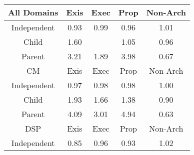 \begin{tabular}{|c||c|c|c|c|}
\hline
All Domains & Exis & Exec & Prop & Non-Arch \\ 
\hline
Independent & \cellcolor[rgb]{0.8931142058397374,0.7600739076414238,0.4042399254504216} 0.93 & \cellcolor[rgb]{0.9075456315936641,0.8283826562100098,0.41770925615408644} 0.99 & \cellcolor[rgb]{0.8999488503932237,0.7924245585279251,0.41061892703367536} 0.96 & \cellcolor[rgb]{0.9093073639652893,0.839671909246716,0.42} 1.01 \\ 
\hline
Child & \cellcolor[rgb]{0.8518547078293851,0.8124574931823403,0.42} 1.60 &  & \cellcolor[rgb]{0.9052202888589498,0.8377359263016078,0.42} 1.05 & \cellcolor[rgb]{0.9002701700241138,0.7939454714474715,0.41091882535583946} 0.96 \\ 
\hline
Parent & \cellcolor[rgb]{0.6970897754325589,0.739147788362791,0.42} 3.21 & \cellcolor[rgb]{0.824441552876614,0.7994723145205014,0.42000000000000004} 1.89 & \cellcolor[rgb]{0.622975884373308,0.7040412083873564,0.42} 3.98 & \cellcolor[rgb]{0.8319089298902969,0.4703689348140714,0.34711500123094363} 0.67 \\ 
\hline
\hline
CM & Exis & Exec & Prop & Non-Arch \\ 
\hline
Independent & \cellcolor[rgb]{0.903599927565026,0.80970632380779,0.41402659906069095} 0.97 & \cellcolor[rgb]{0.905589494999775,0.8191236096656016,0.41588352866645667} 0.98 & \cellcolor[rgb]{0.9050274986626973,0.8164634936700998,0.41535899875185067} 0.98 & \cellcolor[rgb]{0.9097064327738407,0.8398609418402403,0.42} 1.00 \\ 
\hline
Child & \cellcolor[rgb]{0.8206375747052113,0.797670430123521,0.42} 1.93 & \cellcolor[rgb]{0.8459734951978533,0.8096716556200357,0.42} 1.66 & \cellcolor[rgb]{0.8732247048581769,0.8225801233538732,0.42} 1.38 & \cellcolor[rgb]{0.8861989415385498,0.7273416566158026,0.3977856787693132} 0.90 \\ 
\hline
Parent & \cellcolor[rgb]{0.6121985529563104,0.6989361566635155,0.42} 4.09 & \cellcolor[rgb]{0.7158981057413537,0.7480569974564307,0.42} 3.01 & \cellcolor[rgb]{0.53,0.66,0.42} 4.94 & \cellcolor[rgb]{0.8228137130495699,0.42731824176796407,0.3386261321795986} 0.63 \\ 
\hline
\hline
DSP & Exis & Exec & Prop & Non-Arch \\ 
\hline
Independent & \cellcolor[rgb]{0.875204522206978,0.6753014051130289,0.38752422072651277} 0.85 & \cellcolor[rgb]{0.9006467284270318,0.79572784788795,0.41127027986522957} 0.96 & \cellcolor[rgb]{0.894050927455014,0.764507723287066,0.405114198958013} 0.93 & \cellcolor[rgb]{0.9083312003327197,0.8392095159470778,0.42} 1.02 \\ 

\end{tabular}
